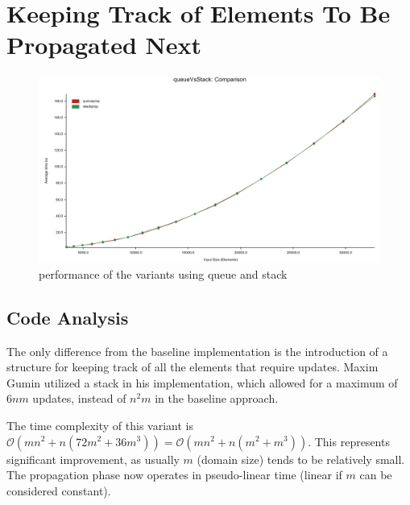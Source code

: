 \documentclass[shortabstract, english, inz]{iithesis}
\begin{document}
\section{Keeping Track of Elements To Be Propagated Next}
\label{stack}
\begin{figure}[H]
\centering
\includegraphics[width=1\textwidth, angle=0]{images/queue_vs_stack_performance.png}
\caption{performance of the variants using queue and stack}
\label{fig:queue_performance}
\end{figure}
\subsection{Code Analysis}
The only difference from the baseline implementation is the introduction of a structure for keeping track of all the elements that require updates. Maxim Gumin utilized a stack in his implementation, which allowed for a maximum of \(6nm\) updates, instead of \(n^2m\) in the baseline approach.

The time complexity of this variant is \(\mathcal{O}(mn^2 + n(72m^2 + 36m^3)) = \mathcal{O}(mn^2 + n(m^2 + m^3))\). This represents significant improvement, as usually \(m\) (domain size) tends to be relatively small. The propagation phase now operates in pseudo-linear time (linear if \(m\) can be considered constant).
\end{document}
